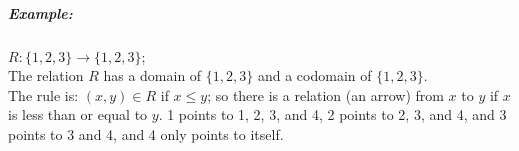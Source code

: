 \documentclass[a4paper,12pt]{book}
\newcounter{question}
\begin{document}
{\begin{introNOHEAD}{}
            \subparagraph{Example:}
            $R : \{1,2,3\} \to \{1,2,3\}$; \\
            
            The relation $R$ has a domain of $\{1,2,3\}$ and a
            codomain of $\{1, 2, 3\}$. \\
            
            The rule is: $(x,y) \in R$ if $x \leq y$;
            so there is a relation (an arrow) from $x$ to $y$ if
            $x$ is less than or equal to $y$. 1 points to 1, 2, 3, and 4,
            2 points to 2, 3, and 4, and 3 points to 3 and 4, and 4 only points to itself.
        \end{introNOHEAD}
    }{}

    
\end{document}
